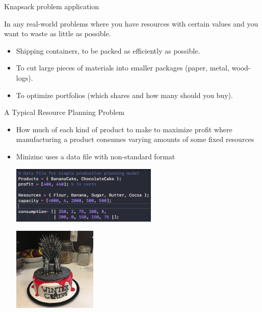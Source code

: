 \documentclass[xcolor=dvipsnames,aspectratio=169]{beamer}
\begin{document}
\begin{frame}{Knapsack problem application}
    
In any real-world problems where you have resources with certain values
and you want to waste as little as possible.
    \begin{itemize}
        \item Shipping containers, to be packed as efficiently as possible.
        \item To cut large  pieces of materials into smaller packages (paper, metal, wood-logs).
        \item To optimize portfolios (which shares and how 
        many should you buy).

    \end{itemize}

\end{frame}

\begin{frame}{A Typical Resource Planning Problem}
        \begin{itemize}
            \item  How much of each kind of product to make to maximize profit where manufacturing a product consumes varying amounts of some fixed resources
            \item Minizinc uses a data file with non-standard format
            \begin{multicols}{2}
            \includegraphics[width = 70mm ]{mz_production_data.png}
            \columnbreak
            
            \includegraphics[width = 40mm]{cake.jpg}
            \end{multicols}
        \end{itemize}

\end{frame}
\end{document}
